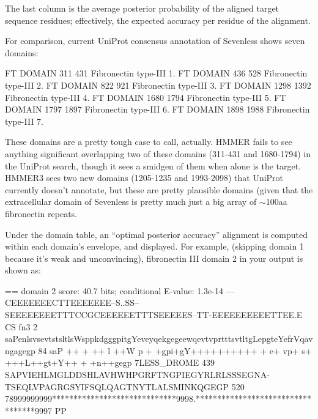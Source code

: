 The last column is the average posterior probability of the aligned
target sequence residues; effectively, the expected accuracy per
residue of the alignment.

For comparison, current UniProt consensus annotation of Sevenless
shows seven domains:

\begin{samepage}
\begin{sreoutput}
FT   DOMAIN      311    431       Fibronectin type-III 1.
FT   DOMAIN      436    528       Fibronectin type-III 2.
FT   DOMAIN      822    921       Fibronectin type-III 3.
FT   DOMAIN     1298   1392       Fibronectin type-III 4.
FT   DOMAIN     1680   1794       Fibronectin type-III 5.
FT   DOMAIN     1797   1897       Fibronectin type-III 6.
FT   DOMAIN     1898   1988       Fibronectin type-III 7.
\end{sreoutput}
\end{samepage}

These domains are a pretty tough case to call, actually. HMMER fails
to see anything significant overlapping two of these domains (311-431
and 1680-1794) in the UniProt search, though it sees a smidgen of them
when  alone is the target. HMMER3 sees two new
domains (1205-1235 and 1993-2098) that UniProt currently doesn't
annotate, but these are pretty plausible domains (given that the
extracellular domain of Sevenless is pretty much just a big array of
$\sim$100aa fibronectin repeats.

Under the domain table, an ``optimal posterior accuracy'' alignment
\citep{Holmes98} is computed within each domain's envelope, and
displayed. For example, (skipping domain 1 because it's weak and
unconvincing), fibronectin III domain 2 in your 
output is shown as:

\begin{samepage}
\begin{sreoutput}
 == domain 2    score: 40.7 bits;  conditional E-value: 1.3e-14
                  ---CEEEEEEECTTEEEEEEE--S..SS--SEEEEEEEETTTCCGCEEEEEETTTSEEEEES--TT-EEEEEEEEEETTEE.E CS
          fn3   2 saPenlsvsevtstsltlsWsppkdgggpitgYeveyqekgegeewqevtvprtttsvtltgLepgteYefrVqavngagegp 84 
                  saP   ++ +  ++ l ++W p +  +gpi+gY++++++++++  + e+ vp+   s+ +++L++gt+Y++ +  +n++gegp
  7LESS_DROME 439 SAPVIEHLMGLDDSHLAVHWHPGRFTNGPIEGYRLRLSSSEGNA-TSEQLVPAGRGSYIFSQLQAGTNYTLALSMINKQGEGP 520
                  78999999999*****************************9998.**********************************9997 PP
\end{sreoutput}
\end{samepage}

